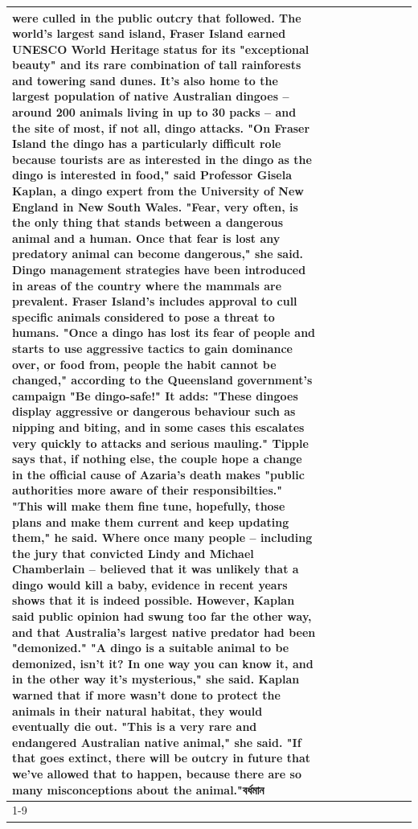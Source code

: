 \begin{table}[H]
\begin{tabular}{lllrlllll}
were culled in the public outcry that followed. The world's largest sand island, Fraser Island earned UNESCO World Heritage status for its "exceptional beauty" and its rare combination of tall rainforests and towering sand dunes. It's also home to the largest population of native Australian dingoes -- around 200 animals living in up to 30 packs -- and the site of most, if not all, dingo attacks. "On Fraser Island the dingo has a particularly difficult role because tourists are as interested in the dingo as the dingo is interested in food," said Professor Gisela Kaplan, a dingo expert from the University of New England in New South Wales. "Fear, very often, is the only thing that stands between a dangerous animal and a human. Once that fear is lost any predatory animal can become dangerous," she said. Dingo management strategies have been introduced in areas of the country where the mammals are prevalent. Fraser Island's includes approval to cull specific animals considered to pose a threat to humans. "Once a dingo has lost its fear of people and starts to use aggressive tactics to gain dominance over, or food from, people the habit cannot be changed," according to the Queensland government's campaign "Be dingo-safe!" It adds: "These dingoes display aggressive or dangerous behaviour such as nipping and biting, and in some cases this escalates very quickly to attacks and serious mauling." Tipple says that, if nothing else, the couple hope a change in the official cause of Azaria's death makes "public authorities more aware of their responsibilties." "This will make them fine tune, hopefully, those plans and make them current and keep updating them," he said. Where once many people -- including the jury that convicted Lindy and Michael Chamberlain -- believed that it was unlikely that a dingo would kill a baby, evidence in recent years shows that it is indeed possible. However, Kaplan said public opinion had swung too far the other way, and that Australia's largest native predator had been "demonized." "A dingo is a suitable animal to be demonized, isn't it? In one way you can know it, and in the other way it's mysterious," she said. Kaplan warned that if more wasn't done to protect the animals in their natural habitat, they would eventually die out. "This is a very rare and endangered Australian native animal," she said. "If that goes extinct, there will be outcry in future that we've allowed that to happen, because there are so many misconceptions about the animal."বর্ধমান \\
\cline{1-9}

\end{tabular}
\end{table}
